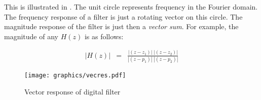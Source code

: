 This is illustrated in .
The unit circle represents frequency in the Fourier domain.
The frequency response of a filter is just a rotating vector on this circle.
The magnitude response of the filter is just then a {\em vector sum}.
For example, the magnitude of any $H(z)$ is as follows:

\begin{eqnarray*}
   |H(z)| &=& \frac{|(z-z_1)|\;|(z-z_2)|}
                 {|(z-p_1)|\;|(z-p_2)|}
\end{eqnarray*}




\begin{figure}[ht]
  \centering%
  \texttt{[image: graphics/vecres.pdf]}
  \caption{
     Vector response of digital filter
     \label{fig:vector}
     }
\end{figure}

